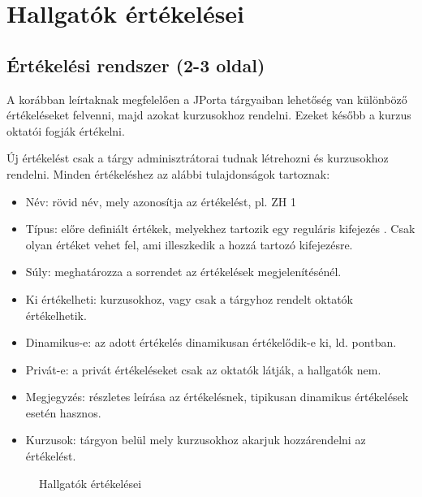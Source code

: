 \chapter{Hallgatók értékelései}\label{chapter:assessments}

\section{Értékelési rendszer (2-3 oldal)}

A korábban leírtaknak megfelelően a JPorta tárgyaiban lehetőség van különböző értékeléseket felvenni, majd azokat kurzusokhoz rendelni. Ezeket később a kurzus oktatói fogják értékelni.

Új értékelést csak a tárgy adminisztrátorai tudnak létrehozni és kurzusokhoz rendelni. Minden értékeléshez az alábbi tulajdonságok tartoznak:
\begin{itemize}
    \item Név: rövid név, mely azonosítja az értékelést, pl. ZH 1
    \item Típus: előre definiált értékek, melyekhez tartozik egy reguláris kifejezés \cite{RegExp}. Csak olyan értéket vehet fel, ami illeszkedik a hozzá tartozó kifejezésre.
    \item Súly: meghatározza a sorrendet az értékelések megjelenítésénél.
    \item Ki értékelheti: kurzusokhoz, vagy csak a tárgyhoz rendelt oktatók értékelhetik.
    \item Dinamikus-e: az adott értékelés dinamikusan értékelődik-e ki, ld.  pontban.
    \item Privát-e: a privát értékeléseket csak az oktatók látják, a hallgatók nem.
    \item Megjegyzés: részletes leírása az értékelésnek, tipikusan dinamikus értékelések esetén hasznos.
    \item Kurzusok: tárgyon belül mely kurzusokhoz akarjuk hozzárendelni az értékelést.
\end{itemize}

\begin{figure}[h]
    \centering
    \caption{Hallgatók értékelései}
    \label{fig:jporta_course_results}
\end{figure}

